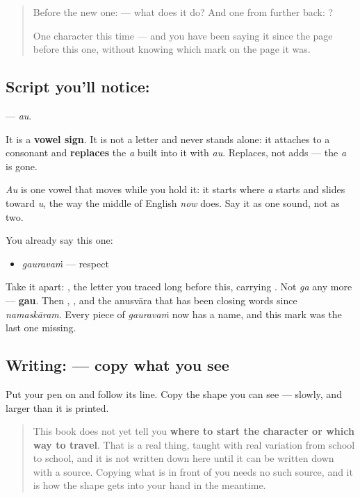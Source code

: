 \label{lesson:TE-S133-vowel-sign-au}



\begin{quote}
Before the new one:  — what does it do? And one from further back: ?

One character this time — and you have been saying it since the page before this one, without knowing which mark on the page it was.
\end{quote}

\subsection*{Script you'll notice: }
\textbf{} — \emph{au}.

It is a \textbf{vowel sign}. It is not a letter and never stands alone: it attaches to a consonant and \textbf{replaces} the \emph{a} built into it with \emph{au}. Replaces, not adds — the \emph{a} is gone.

\emph{Au} is one vowel that moves while you hold it: it starts where \emph{a} starts and slides toward \emph{u}, the way the middle of English \emph{now} does. Say it as one sound, not as two.

You already say this one:

\begin{itemize}
\raggedright
  \item \textbf{} \emph{gauravaṁ} — respect
\end{itemize}

Take it apart: \textbf{}, the letter you traced long before this, carrying \textbf{}. Not \emph{ga} any more — \textbf{gau}. Then \textbf{}, \textbf{}, and the anusvāra \textbf{} that has been closing words since \emph{namaskāram}. Every piece of \emph{gauravaṁ} now has a name, and this mark was the last one missing.

\subsection*{Writing:  — copy what you see}
Put your pen on  and follow its line. Copy the shape you can see — slowly, and larger than it is printed.

\begin{quote}
This book does not yet tell you \textbf{where to start the character or which way to travel}. That is a real thing, taught with real variation from school to school, and it is not written down here until it can be written down with a source. Copying what is in front of you needs no such source, and it is how the shape gets into your hand in the meantime.
\end{quote}

